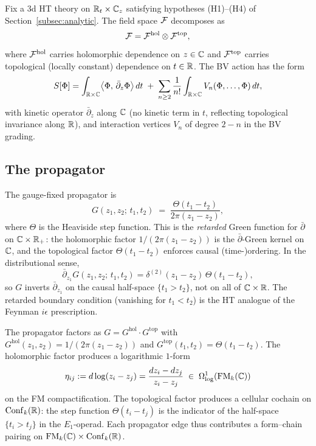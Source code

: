 Fix a 3d HT theory on $\mathbb{R}_t \times \mathbb{C}_z$ satisfying hypotheses
(H1)--(H4) of Section~\ref{subsec:analytic}. The field space $\mathcal{F}$
decomposes as
\begin{equation}
\mathcal{F} = \mathcal{F}^{\mathrm{hol}} \otimes \mathcal{F}^{\mathrm{top}},
\end{equation}
where $\mathcal{F}^{\mathrm{hol}}$ carries holomorphic dependence on $z \in \mathbb{C}$
and $\mathcal{F}^{\mathrm{top}}$ carries topological (locally constant)
dependence on $t \in \mathbb{R}$. The BV action has the form
\begin{equation}
S[\Phi] = \int_{\mathbb{R} \times \mathbb{C}}
\bigl\langle \Phi,\, \bar\partial_z \Phi \bigr\rangle \, dt
\;+\; \sum_{n \ge 2} \frac{1}{n!}
\int_{\mathbb{R} \times \mathbb{C}} V_n(\Phi,\ldots,\Phi)\, dt,
\end{equation}
with kinetic operator $\bar\partial_z$ along $\mathbb{C}$ (no kinetic term
in $t$, reflecting topological invariance along $\mathbb{R}$), and
interaction vertices $V_n$ of degree $2-n$ in the BV grading.

\subsection{The propagator}

\begin{definition}
The gauge-fixed propagator is
\begin{equation}
G(z_1, z_2;\, t_1, t_2)
\;=\;
\frac{\Theta(t_1 - t_2)}{2\pi(z_1 - z_2)},
\end{equation}
where $\Theta$ is the Heaviside step function. This is the
\emph{retarded} Green function for $\bar\partial$ on
$\mathbb{C} \times \mathbb{R}_+$: the holomorphic factor
$1/(2\pi(z_1 - z_2))$ is the $\bar\partial$-Green kernel on
$\mathbb{C}$, and the topological factor $\Theta(t_1 - t_2)$ enforces
causal (time-)ordering. In the distributional sense,
\[
\bar\partial_{z_1} G(z_1, z_2;\, t_1, t_2)
= \delta^{(2)}(z_1 - z_2)\,\Theta(t_1 - t_2),
\]
so $G$ inverts $\bar\partial_{z_1}$ on the causal half-space
$\{t_1 > t_2\}$, not on all of $\mathbb{C} \times \mathbb{R}$. The retarded
boundary condition (vanishing for $t_1 < t_2$) is the HT analogue
of the Feynman $i\epsilon$ prescription.
\end{definition}

\begin{remark}
The propagator factors as $G = G^{\mathrm{hol}} \cdot G^{\mathrm{top}}$
with $G^{\mathrm{hol}}(z_1,z_2) = 1/(2\pi(z_1 - z_2))$ and
$G^{\mathrm{top}}(t_1,t_2) = \Theta(t_1 - t_2)$. The holomorphic
factor produces a logarithmic $1$-form
\[
\eta_{ij} := d\log(z_i - z_j)
= \frac{dz_i - dz_j}{z_i - z_j}
\;\in\; \Omega^1_{\log}(\operatorname{FM}_k(\mathbb{C}))
\]
on the FM compactification. The topological factor produces a
cellular cochain on $\operatorname{Conf}_k(\mathbb{R})$: the step function $\Theta(t_i - t_j)$
is the indicator of the half-space $\{t_i > t_j\}$ in the
$E_1$-operad. Each propagator edge thus contributes a form--chain
pairing on $\operatorname{FM}_k(\mathbb{C}) \times \operatorname{Conf}_k(\mathbb{R})$.
\end{remark}


